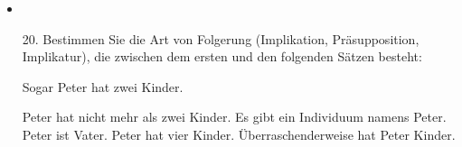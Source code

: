 \begin{frame}
\begin{minipage}[t]{0.60\textwidth}
	\begin{itemize}
		\item {}
		
	\end{itemize}

	\end{minipage}


\end{frame}


\begin{frame}
	
\begin{itemize}
	\item[20.] Bestimmen Sie die Art von Folgerung (Implikation, Präsupposition, Implikatur), die zwischen dem ersten und den folgenden Sätzen besteht:
	
	\begin{exe}
		 Sogar Peter hat zwei Kinder.
	\settowidth {}
		
		\begin{xlist}
			\ex Peter hat nicht mehr als zwei Kinder. 
			\ex Es gibt ein Individuum namens Peter. 
			\ex Peter ist Vater. 
			\ex Peter hat vier Kinder. 
			\ex Überraschenderweise hat Peter Kinder. 
		\end{xlist} 
		
	\end{exe}

\end{itemize}
	
\end{frame}


